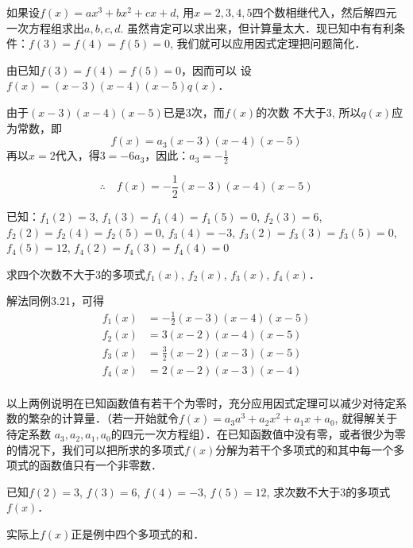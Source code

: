 \begin{analyze}
如果设$f(x)=ax^3+bx^2+cx+d$, 用$x=2, 3,
4, 5$四个数相继代入，然后解四元一次方程组求出$a,b,c,d$. 虽然肯定可以求出来，但计算量太大．现已知中有有利条件：$f(3)=f(4)=f(5)=0$, 我们就可以应用因式定理把问题简化．
\end{analyze}

\begin{solution}
    由已知$f(3)=f(4)=f(5)=0$，因而可以
    设$f(x)=(x-3)(x-4)(x-5)q(x)$．
    
    由于$(x-3)(x-4)(x-5)$已是3次，而$f(x)$的次数
不大于3, 所以$q(x)$应为常数，即
\[f(x)=a_3(x-3)(x-4)(x-5)\]
再以$x=2$代入，得$3=-6a_3$，因此：$a_3=-\frac{1}{2}$

\[\therefore\quad f(x)=-\frac{1}{2}(x-3)(x-4)(x-5)\]
\end{solution}


\begin{example}
已知：$f_1(2)=3$, $f_1(3)=f_1(4)=f_1(5)=0$, $f_2(3)=6$, $f_2(2)=f_2(4)=f_2(5)=0$, $f_3(4)=-3$, $f_3(2)=f_3(3)=f_3(5)=0$, $f_4(5)=12$, $f_4(2)=f_4(3)=f_4(4)=0$

求四个次数不大于3的多项式$f_1(x)$, $f_2(x)$, $f_3(x)$, $f_4(x)$．
\end{example}

\begin{solution}
    解法同例3.21，可得
\[\begin{split}
    f_1(x)&=-\frac{1}{2}(x-3)(x-4)(x-5)\\
    f_2(x)&=3(x-2)(x-4)(x-5)\\
    f_3(x)&=\frac{3}{2}(x-2)(x-3)(x-5)\\
    f_4(x)&={2}(x-2)(x-3)(x-4)\\
\end{split}\]
\end{solution}

以上两例说明在已知函数值有若干个为零时，充分应用因式定理可以减少对待定系数的繁杂的计算量．（若一开始就令$f(x) =a_3a^3+a_2x^2+a_1x+a_0$, 就得解关于待定系数 $a_3,a_2,a_1,a_0$的四元一次方程组）．在已知函数值中没有零，或者很少为零的情况下，我们可以把所求的多项式$f(x)$分解为若干个多项式的和其中每一个多项式的函数值只有一个非零数．


\begin{example}
    已知$f(2)=3$, $f(3)=6$, $f(4)=-3$, $f(5)=12$, 求次数不大于3的多项式$f(x)$．
\end{example}

\begin{analyze}
    实际上$f(x)$正是例中四个多项式的和．
\end{analyze}

